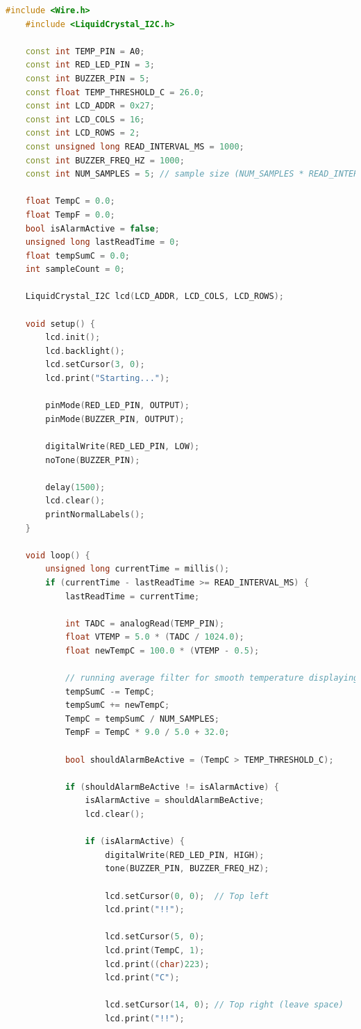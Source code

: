 \documentclass[10pt]{article}
\begin{document}
\begin{lstlisting}[language=C++, caption={Arduino sketch for running average temperature monitoring}]
	#include <Wire.h>
	#include <LiquidCrystal_I2C.h>
	
	const int TEMP_PIN = A0;
	const int RED_LED_PIN = 3;
	const int BUZZER_PIN = 5;
	const float TEMP_THRESHOLD_C = 26.0;
	const int LCD_ADDR = 0x27;
	const int LCD_COLS = 16;
	const int LCD_ROWS = 2;
	const unsigned long READ_INTERVAL_MS = 1000;
	const int BUZZER_FREQ_HZ = 1000;
	const int NUM_SAMPLES = 5; // sample size (NUM_SAMPLES * READ_INTERVAL_MS) is 5s
	
	float TempC = 0.0;
	float TempF = 0.0;
	bool isAlarmActive = false;
	unsigned long lastReadTime = 0;
	float tempSumC = 0.0;
	int sampleCount = 0;
	
	LiquidCrystal_I2C lcd(LCD_ADDR, LCD_COLS, LCD_ROWS);
	
	void setup() {
		lcd.init();
		lcd.backlight();
		lcd.setCursor(3, 0);
		lcd.print("Starting...");
	
		pinMode(RED_LED_PIN, OUTPUT);
		pinMode(BUZZER_PIN, OUTPUT);
	
		digitalWrite(RED_LED_PIN, LOW);
		noTone(BUZZER_PIN);
	
		delay(1500);
		lcd.clear();
		printNormalLabels();
	}
	
	void loop() {
		unsigned long currentTime = millis();
		if (currentTime - lastReadTime >= READ_INTERVAL_MS) {
			lastReadTime = currentTime;
	
			int TADC = analogRead(TEMP_PIN);
			float VTEMP = 5.0 * (TADC / 1024.0);
			float newTempC = 100.0 * (VTEMP - 0.5);
	
			// running average filter for smooth temperature displaying
			tempSumC -= TempC;
			tempSumC += newTempC;
			TempC = tempSumC / NUM_SAMPLES;
			TempF = TempC * 9.0 / 5.0 + 32.0;
	
			bool shouldAlarmBeActive = (TempC > TEMP_THRESHOLD_C);
	
			if (shouldAlarmBeActive != isAlarmActive) {
				isAlarmActive = shouldAlarmBeActive;
				lcd.clear();
	
				if (isAlarmActive) {
					digitalWrite(RED_LED_PIN, HIGH);
					tone(BUZZER_PIN, BUZZER_FREQ_HZ);
	
					lcd.setCursor(0, 0);  // Top left
					lcd.print("!!");
	
					lcd.setCursor(5, 0);
					lcd.print(TempC, 1);
					lcd.print((char)223);
					lcd.print("C");
	
					lcd.setCursor(14, 0); // Top right (leave space)
					lcd.print("!!");
	

\end{lstlisting}
\end{document}
